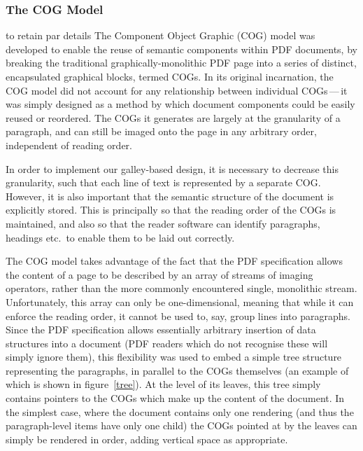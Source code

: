 \subsubsection{The COG Model}
to retain par details
The Component Object Graphic (COG) model was developed to enable the reuse of semantic components
within PDF documents, by breaking the traditional graphically-monolithic PDF page into a series of
distinct, encapsulated graphical blocks, termed COGs. In its original incarnation, the COG model did
not account for any relationship between individual COGs\,---\,it was simply designed as a method by
which document components could be easily reused or reordered. The COGs it generates are largely at
the granularity of a paragraph, and can still be imaged onto the page in any arbitrary order,
independent of reading order.

In order to implement our galley-based design, it is necessary to decrease this granularity, such
that each line of text is represented by a separate COG. However, it is also important that the
semantic structure of the document is explicitly stored. This is principally so that the reading
order of the COGs is maintained, and also so that the reader software can identify paragraphs,
headings etc.~to enable them to be laid out correctly.

The COG model takes advantage of the fact that the PDF specification allows the content of a page to
be described by an array of streams of imaging operators, rather than the more commonly encountered
single, monolithic stream. Unfortunately, this array can only be one-di\-men\-sional, meaning that
while it can enforce the reading order, it cannot be used to, say, group lines into paragraphs.
Since the PDF specification allows essentially arbitrary insertion of data structures into a
document (PDF readers which do not recognise these will simply ignore them), this flexibility was
used to embed a simple tree structure representing the paragraphs, in parallel to the COGs
themselves (an example of which is shown in figure~\ref{tree}). At the level of its leaves, this
tree simply contains pointers to the COGs which make up the content of the document. In the simplest
case, where the document contains only one rendering (and thus the pa\-ra\-graph-level items have
only one child) the COGs pointed at by the leaves can simply be rendered in order, adding vertical
space as appropriate.


